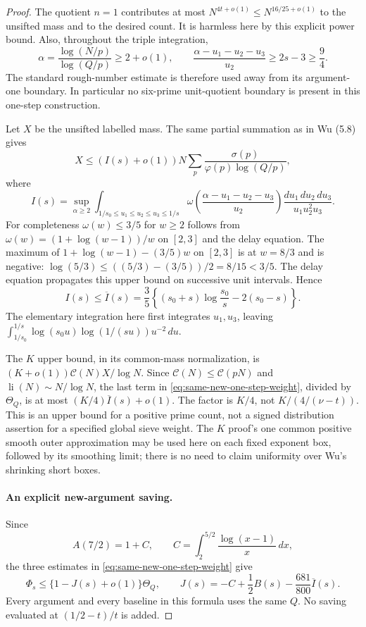 \begin{proof}
The quotient $n=1$ contributes at most $N^{4t+o(1)}\le N^{16/25+o(1)}$
to the unsifted mass and to the desired count. It is harmless here
by this explicit power bound. Also, throughout the triple integration,
\[
 \alpha=\frac{\log(N/p)}{\log(Q/p)}\ge2+o(1),\qquad
 \frac{\alpha-u_1-u_2-u_3}{u_2}\ge2s-3\ge\frac94.
\]
The standard rough-number estimate is therefore used away from its
argument-one boundary. In particular no six-prime unit-quotient
boundary is present in this one-step construction.

Let $X$ be the unsifted labelled mass. The same partial summation as
in Wu (5.8) gives
\[
 X\le (I(s)+o(1))N
       \sum_p\frac{\sigma(p)}{\varphi(p)\log(Q/p)},
\]
where
\[
 I(s)=\sup_{\alpha\ge2}
 \int_{1/s_0\le u_1\le u_2\le u_3\le1/s}
 \omega\!\left(\frac{\alpha-u_1-u_2-u_3}{u_2}\right)
 \frac{du_1\,du_2\,du_3}{u_1u_2^2u_3}.
\]
For completeness $\omega(w)\le3/5$ for $w\ge2$ follows from
$\omega(w)=(1+\log(w-1))/w$ on $[2,3]$ and the delay equation.
The maximum of
$1+\log(w-1)-(3/5)w$ on $[2,3]$ is at $w=8/3$ and is negative:
$\log(5/3)\le((5/3)-(3/5))/2=8/15<3/5$.
The delay equation propagates this upper bound on successive unit
intervals. Hence
\begin{equation}\label{eq:same-new-one-step-Ibar}
 I(s)\le\overline I(s)=\frac35
 \left\{(s_0+s)\log\frac{s_0}{s}-2(s_0-s)\right\}.
\end{equation}
The elementary integration here first integrates $u_1,u_3$, leaving
$\int_{1/s_0}^{1/s}\log(s_0u)\log(1/(su))u^{-2}\,du$.

The $K$ upper bound, in its common-mass normalization, is
$(K+o(1))\mathcal C(N)X/\log N$. Since
$\mathcal C(N)\le\mathcal C(pN)$ and $\operatorname{li}(N)\sim N/\log N$,
the last term in \eqref{eq:same-new-one-step-weight}, divided by
$\Theta_Q$, is at most $(K/4)\overline I(s)+o(1)$.
The factor is $K/4$, not $K/(4/(\nu-t))$.
This is an upper bound for a positive prime count, not a signed
distribution assertion for a specified global sieve weight.
The $K$ proof's one common positive smooth outer approximation may be
used here on each fixed exponent box, followed by its smoothing limit;
there is no need to claim uniformity over Wu's shrinking short boxes.

\paragraph{An explicit new-argument saving.}
Since
\[
 A(7/2)=1+C,\qquad
 C=\int_2^{5/2}\frac{\log(x-1)}x\,dx,
\]
the three estimates in \eqref{eq:same-new-one-step-weight} give
\begin{equation}\label{eq:same-new-one-step-J}
 \Phi_s\le\{1-J(s)+o(1)\}\Theta_Q,\qquad
 J(s)=-C+\frac12B(s)-\frac{681}{800}\overline I(s).
\end{equation}
Every argument and every baseline in this formula uses the same $Q$.
No saving evaluated at $(1/2-t)/t$ is added.


\end{proof}
